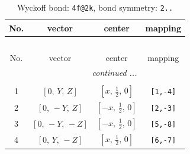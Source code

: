 \documentclass[fleqn,8pt]{jsarticle}
\begin{document}
\renewcommand{\arraystretch}{1.2}
\begin{longtable}{cccc}
\caption{Wyckoff bond: {\tt 4f@2k}, bond symmetry: {\tt 2..}}
 \\
 \hline \hline
No. & vector & center & mapping \\ \hline \endfirsthead

\multicolumn{3}{l}{\tablename\ \thetable{}} \\
 \hline \hline
No. & vector & center & mapping \\ \hline \endhead

 \hline \hline
\multicolumn{3}{r}{\footnotesize\it continued ...} \\ \endfoot

 \hline \hline
\multicolumn{3}{r}{} \\ \endlastfoot

1 & $\left[ 0,\, Y,\, Z \right]$ & $\left[ x,\, \frac{1}{2},\, 0 \right]$ & {\tt [1,-4]} \\ \hline
2 & $\left[ 0,\, - Y,\, Z \right]$ & $\left[ - x,\, \frac{1}{2},\, 0 \right]$ & {\tt [2,-3]} \\ \hline
3 & $\left[ 0,\, - Y,\, - Z \right]$ & $\left[ - x,\, \frac{1}{2},\, 0 \right]$ & {\tt [5,-8]} \\ \hline
4 & $\left[ 0,\, Y,\, - Z \right]$ & $\left[ x,\, \frac{1}{2},\, 0 \right]$ & {\tt [6,-7]} \\
\end{longtable}
\renewcommand{\arraystretch}{1.2}
\end{document}
